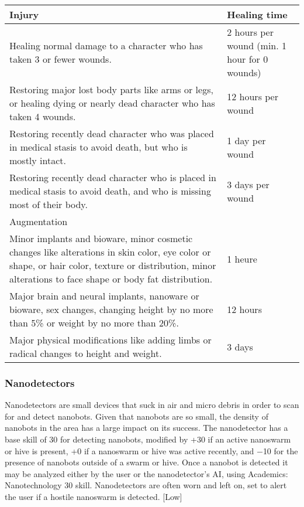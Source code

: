 {{\begin{table}
\begin{tabularx}{\textwidth}{|X|X|}
\textbf{Injury}	&\textbf{Healing time} \\ \hline

Healing normal damage to a character who has taken 3 or fewer wounds.	&2 hours per wound (min. 1 hour for 0 wounds) \\ \hline

Restoring major lost body parts like arms or legs, or healing dying or nearly dead character who has taken 4 wounds.	&12 hours per wound \\ \hline

Restoring recently dead character who was placed in medical stasis to avoid death, but who is mostly intact.	&1 day per wound \\ \hline

Restoring recently dead character who is placed in medical stasis to avoid death, and who is missing most of their body.	&3 days per wound \\ \hline

\multicolumn{2}{|l|}{Augmentation} \\ \hline

Minor implants and bioware, minor cosmetic changes like alterations in skin color, eye color or shape, or hair color, texture or distribution, minor alterations to face shape or body fat distribution.	&1 heure \\ \hline

Major brain and neural implants, nanoware or bioware, sex changes, changing height by no more than 5\% or weight by no more than 20\%.	&12 hours \\ \hline

Major physical modifications like adding limbs or radical changes to height and weight.	&3 days \\ \hline

\end{tabularx} \label{tab:healing-vat} \end{table} 

\subsubsection{Nanodetectors} 

Nanodetectors are small devices that suck in air and micro debris in order to scan for and detect nanobots. Given that nanobots are so small, the density of nanobots in the area has a large impact on its success. The nanodetector has a base skill of 30 for detecting nanobots, modified by +30 if an active nanoswarm or hive is present, +0 if a nanoswarm or hive was active recently, and $-$10 for the presence of nanobots outside of a swarm or hive. Once a nanobot is detected it may be analyzed either by the user or the nanodetector’s AI, using Academics: Nanotechnology 30 skill. Nanodetectors are often worn and left on, set to alert the user if a hostile nanoswarm is detected. [Low] 

}}
